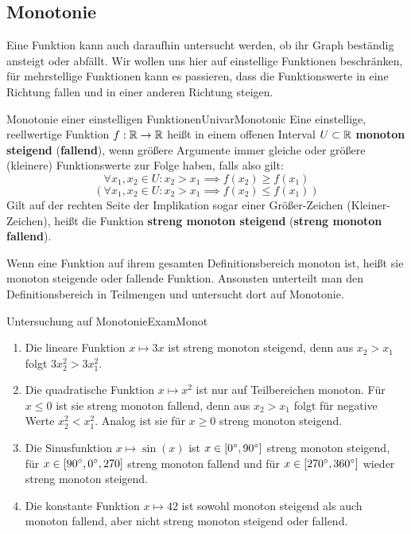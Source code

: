 \subsection{Monotonie}

Eine Funktion kann auch daraufhin untersucht werden, ob ihr Graph beständig ansteigt oder abfällt. Wir wollen uns hier auf einstellige Funktionen beschränken, für mehrstellige Funktionen kann es passieren, dass die Funktionswerte in eine Richtung fallen und in einer anderen Richtung steigen.

\begin{definition}{Monotonie einer einstelligen Funktionen}{UnivarMonotonic}
    Eine einstellige, reellwertige Funktion $f: \mathbb{R} \to \mathbb{R}$ heißt in einem offenen Interval $U\subset\mathbb{R}$ \textbf{monoton steigend} (\textbf{fallend}), wenn größere Argumente immer gleiche oder größere (kleinere) Funktionswerte zur Folge haben, falls also gilt:
    $$
        \forall x_1,x_2 \in U: x_2 > x_1 \implies f(x_2) \ge f(x_1)
    $$
    $$
      ( \forall x_1,x_2 \in U: x_2 > x_1 \implies f(x_2) \le f(x_1) )
    $$
    Gilt auf der rechten Seite der Implikation sogar einer Größer-Zeichen (Kleiner-Zeichen), heißt die Funktion \textbf{streng monoton steigend} (\textbf{streng monoton fallend}).
\end{definition}

Wenn eine Funktion auf ihrem gesamten Definitionsbereich monoton ist, heißt sie monoton steigende oder fallende Funktion. Ansonsten unterteilt man den Definitionsbereich in Teilmengen und untersucht dort auf Monotonie.

\begin{example}{Untersuchung auf Monotonie}{ExamMonot}
    \begin{enumerate}
        \item Die lineare Funktion $x \mapsto 3x$ ist streng monoton steigend, denn aus $x_2 > x_1$ folgt $3x_2^2 > 3x_1^2$.
        \item Die quadratische Funktion $x \mapsto x^2$ ist nur auf Teilbereichen monoton. Für $x\le 0$ ist sie streng monoton fallend, denn aus $x_2 > x_1$ folgt für negative Werte $x_2^2 < x_1^2$. Analog ist sie für $x\ge 0$ streng monoton steigend.
        \item Die Sinusfunktion $x \mapsto \sin(x)$ ist $x\in[\SI{0}{\degree},\SI{90}{\degree}]$ streng monoton steigend, für $x\in[\SI{90}{\degree}, \SI{0}{\degree},270]$ streng monoton fallend und für $x\in[\SI{270}{\degree},\SI{360}{\degree}]$ wieder streng monoton steigend.
        \item Die konstante Funktion $x \mapsto 42$ ist sowohl monoton steigend als auch monoton fallend, aber nicht streng monoton steigend oder fallend.
    \end{enumerate}
\end{example}

